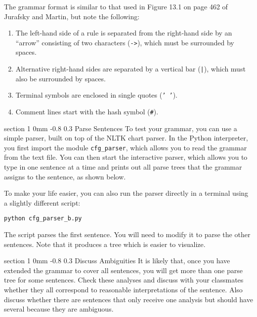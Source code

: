 \documentclass[10.9pt]{article}
\makeatletter
\newcommand{\newsec}[2]{\section{#1}\label{sec:#2}\noindent}
\renewcommand{\section}{\@startsection
{section}%
{1}%
{0mm}%
{-0.8\baselineskip}%
{0.3\baselineskip}%
{\bfseries\large}}%
\makeatother
\begin{document}
\begin{center}
\fbox{

}
\end{center}
The grammar format is similar to that used in Figure 13.1 on page 462 of Jurafsky and Martin, but note the following: %
\begin{enumerate}[noitemsep]
\item The left-hand side of a rule is separated from the right-hand side by an ``arrow'' consisting of two characters ({\tt ->}), which must be surrounded by spaces.
\item Alternative right-hand sides are separated by a vertical bar ({\tt |}), which must also be surrounded by spaces.
\item Terminal symbols are enclosed in single quotes ({\tt ' '}).
\item Comment lines start with the hash symbol ({\tt \#}).
\end{enumerate}

\newsec{Parse Sentences}{parse}%
To test your grammar, you can use a simple parser, built on top of the NLTK chart parser. In the Python interpreter, you first import the module {\tt cfg\_parser}, which allows you 
to read the grammar from the text file. You can then start the interactive parser, which allows you to type in one sentence at a time and prints out all parse trees that the grammar assigns to the sentence, as shown below.
\begin{center}
\fbox{

}
\end{center}
To make your life easier, you can also run the parser directly in a terminal using a slightly different script: 
\begin{verbatim}
python cfg_parser_b.py 
\end{verbatim}
The script parses the first sentence. You will need to modify it to parse the other sentences. Note that it produces a tree which is easier to visualize.

\newsec{Discuss Ambiguities}{parse}%
It is likely that, once you have extended the grammar to cover all sentences, you will get more than one parse tree for some sentences. Check these analyses and discuss with your classmates whether they all correspond to reasonable interpretations of the sentence. Also discuss whether there are sentences that only receive one analysis but should have several because they are ambiguous.
\end{document}
